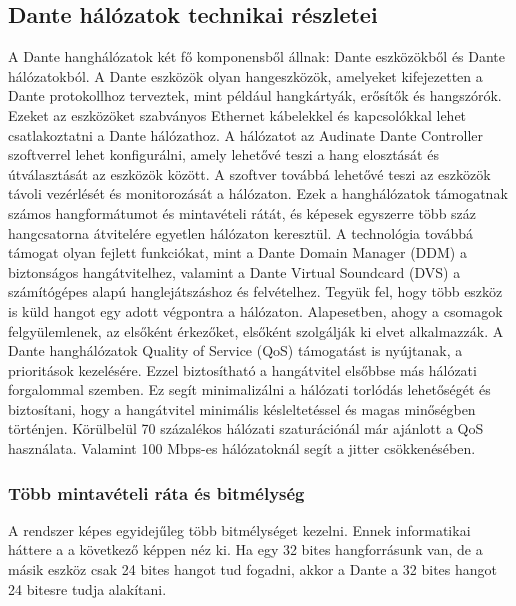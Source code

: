 \subsection{Dante hálózatok technikai részletei}
A Dante hanghálózatok két fő komponensből állnak: Dante eszközökből
és Dante hálózatokból. A Dante eszközök olyan hangeszközök, amelyeket
kifejezetten a Dante protokollhoz terveztek, mint például hangkártyák, erősítők
és hangszórók. Ezeket az eszközöket szabványos Ethernet kábelekkel és
kapcsolókkal lehet csatlakoztatni a Dante hálózathoz.
A hálózatot az Audinate Dante Controller szoftverrel lehet
konfigurálni, amely lehetővé teszi a hang elosztását és útválasztását az
eszközök között. A szoftver továbbá lehetővé teszi az eszközök távoli vezérlését
és monitorozását a hálózaton. Ezek a hanghálózatok támogatnak számos
hangformátumot és mintavételi rátát, és képesek egyszerre több száz hangcsatorna
átvitelére egyetlen hálózaton keresztül. A technológia továbbá támogat olyan
fejlett funkciókat, mint a Dante Domain Manager (DDM) a biztonságos
hangátvitelhez, valamint a Dante Virtual Soundcard (DVS) a számítógépes alapú
hanglejátszáshoz és felvételhez. 
Tegyük fel, hogy több eszköz is küld hangot egy adott végpontra a hálózaton.
Alapesetben, ahogy a csomagok felgyülemlenek, az elsőként érkezőket, elsőként szolgálják ki elvet alkalmazzák.
A Dante hanghálózatok Quality of Service (QoS)
támogatást is nyújtanak, a prioritások kezelésére.
Ezzel biztosítható a hangátvitel elsőbbse más hálózati forgalommal szemben. Ez segít minimalizálni a hálózati
torlódás lehetőségét és biztosítani, hogy a hangátvitel minimális késleltetéssel
és magas minőségben történjen. 
Körülbelül 70 százalékos hálózati szaturációnál már ajánlott a QoS használata.
Valamint 100 Mbps-es hálózatoknál segít a jitter csökkenésében.

\subsubsection{Több mintavételi ráta és bitmélység}

A rendszer képes egyidejűleg több bitmélységet kezelni. Ennek informatikai háttere a
a következő képpen néz ki. Ha egy 32 bites hangforrásunk van, de a másik eszköz
csak 24 bites hangot tud fogadni, akkor a Dante a 32 bites hangot 24 bitesre tudja 
alakítani.

